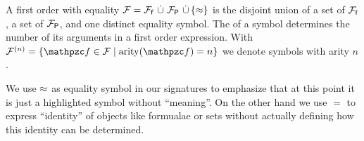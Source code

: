 
\begin{definition}\label{def:signature}
A
first order
 with equality
\( \mathcal{F} = {\mathcal{F}_{\mathsf{f}}} \,\mathop{\dot\cup} \,{\mathcal{F}_{\mathsf{P}}} \,\mathop{\dot\cup} \, \{\approx \} \)
is the disjoint union of
a set of  \( {\mathcal{F}_{\mathsf{f}}} \),
a set of  \( {\mathcal{F}_{\mathsf{P}}} \),
and one distinct equality symbol.
%
The  of a symbol determines the number of its arguments in a first order expression.
With \( \mcFn = \{ \mcf\in\mcF \mid \arity(\mcf) = n \} \) we denote symbols with arity \( n \).
\end{definition}

\begin{remark}
    We use \( \approx \) as equality symbol in our signatures to emphasize
    that at this point it is just a highlighted symbol
    without “meaning”.
    On the other hand we use \( = \) to express “identity” of objects
    like formualae or sets
    without actually defining how this identity can be determined.
\end{remark}
